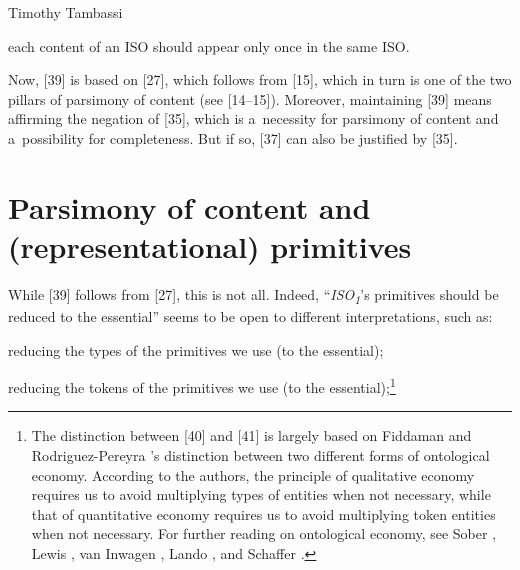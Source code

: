 \begin{artengenv}{Timothy Tambassi}
\begin{enumerate}[label={[\arabic*]}]
\item each content of an ISO should appear only once in the same ISO.

\end{enumerate}

Now, [39] is based on [27], which follows from [15], which in turn is one of the two pillars of parsimony of content (see [14–15]). Moreover, maintaining [39] means affirming the negation of [35], which is a~necessity for parsimony of content and a~possibility for completeness. But if so, [37] can also be justified by [35].



\section{Parsimony of content and (representational) primitives}

While [39] follows from [27], this is not all. Indeed, ``\textit{ISO}\textit{\textsubscript{1}}'s primitives should be reduced to the essential'' seems to be open to different interpretations, such as:



\setcounter{saveenumtambassi}{\value{enumi}}

\begin{enumerate}[label={[\arabic*]}]

\setcounter{enumi}{\value{saveenumtambassi}}

\item reducing the types of the primitives we use (to the essential);

\item reducing the tokens of the primitives we use (to the essential);\footnote{The distinction between [40] and [41] is largely based on Fiddaman and Rodriguez-Pereyra 
\parencite*[][]{fiddaman_razor_2018}%
's distinction between two different forms of ontological economy. According to the authors, the principle of qualitative economy requires us to avoid multiplying types of entities when not necessary, while that of quantitative economy requires us to avoid multiplying token entities when not necessary. For further reading on ontological economy, see Sober 
\parencite*[][]{sober_simplicity_1975}, %
 Lewis 
\parencite*[][]{lewis_counterfactuals_1973}, %
 van Inwagen 
\parencite*[][]{van_inwagen_ontology_2001}, %
 Lando 
\parencite*[][]{lando_ontologia_2010}, %
 and Schaffer 
\parencite*[][]{schaffer_what_2015}.%
}



\end{enumerate}
\end{artengenv}
